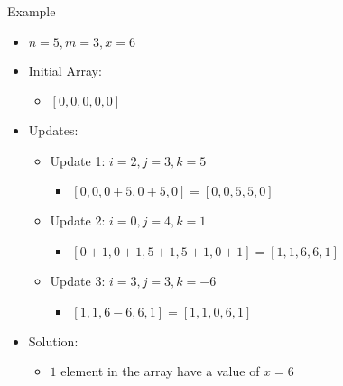 \documentclass{beamer}
\begin{document}
\begin{frame}{Example}
    \begin{itemize}
        \item $n = 5, m = 3, x = 6$
        
        \item Initial Array:
        \begin{itemize}
            \item $[0, 0, 0, 0, 0]$
        \end{itemize}
        
        \item Updates:
        \begin{itemize}
            \item Update 1: $i = 2, j = 3, k = 5$
            \begin{itemize}
                \item $[0, 0, 0 + 5, 0 + 5, 0] = [0, 0, 5, 5, 0]$
            \end{itemize}
            
            \item Update 2: $i = 0, j = 4, k = 1$
            \begin{itemize}
                \item $[0 + 1, 0 + 1, 5 + 1, 5 + 1, 0 + 1] = [1, 1, 6, 6, 1]$
            \end{itemize}
        
            \item Update 3: $i = 3, j = 3, k = -6$
            \begin{itemize}
                \item $[1, 1, 6 - 6, 6, 1] = [1, 1, 0, 6, 1]$
            \end{itemize}
        \end{itemize}
        
        \item Solution:
        \begin{itemize}
            \item $1$ element in the array have a value of $x = 6$
        \end{itemize}
    \end{itemize}
\end{frame}
\end{document}
